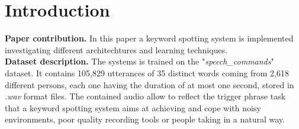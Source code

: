 
\section{Introduction}
\label{sec:introduction}

\noindent \textbf{Paper contribution.} In this paper a keyword spotting system is implemented investigating different architechtures and learning techniques. \\

\noindent \textbf{Dataset description.} \cite{Warden-2018} The systems is trained on the \mbox{"{\it speech\_commands}"} dataset. It contains 105,829 utterances of 35 distinct words coming from 2,618 different persons, each one having the duration of at most one second, stored in {\it .wav} format files. The contained audio allow to reflect the trigger phrase task that a keyword spotting system aims at achieving and cope with noisy environments, poor quality recording tools or people taking in a natural way. 

